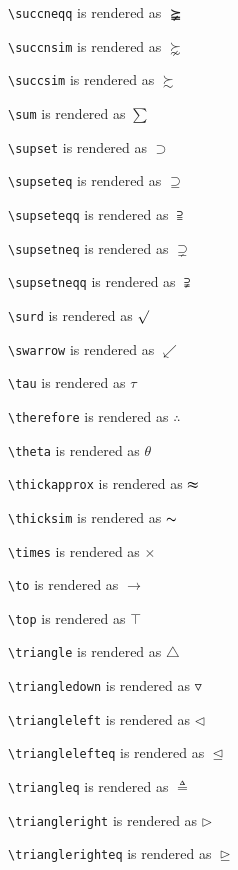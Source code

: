 \texttt{\textbackslash succneqq} is rendered as $\succneqq$

\texttt{\textbackslash succnsim} is rendered as $\succnsim$

\texttt{\textbackslash succsim} is rendered as $\succsim$

\texttt{\textbackslash sum} is rendered as $\sum$

\texttt{\textbackslash supset} is rendered as $\supset$

\texttt{\textbackslash supseteq} is rendered as $\supseteq$

\texttt{\textbackslash supseteqq} is rendered as $\supseteqq$

\texttt{\textbackslash supsetneq} is rendered as $\supsetneq$

\texttt{\textbackslash supsetneqq} is rendered as $\supsetneqq$

\texttt{\textbackslash surd} is rendered as $\surd$

\texttt{\textbackslash swarrow} is rendered as $\swarrow$

\texttt{\textbackslash tau} is rendered as $\tau$

\texttt{\textbackslash therefore} is rendered as $\therefore$

\texttt{\textbackslash theta} is rendered as $\theta$

\texttt{\textbackslash thickapprox} is rendered as $\thickapprox$

\texttt{\textbackslash thicksim} is rendered as $\thicksim$

\texttt{\textbackslash times} is rendered as $\times$

\texttt{\textbackslash to} is rendered as $\to$

\texttt{\textbackslash top} is rendered as $\top$

\texttt{\textbackslash triangle} is rendered as $\triangle$

\texttt{\textbackslash triangledown} is rendered as $\triangledown$

\texttt{\textbackslash triangleleft} is rendered as $\triangleleft$

\texttt{\textbackslash trianglelefteq} is rendered as $\trianglelefteq$

\texttt{\textbackslash triangleq} is rendered as $\triangleq$

\texttt{\textbackslash triangleright} is rendered as $\triangleright$

\texttt{\textbackslash trianglerighteq} is rendered as $\trianglerighteq$



